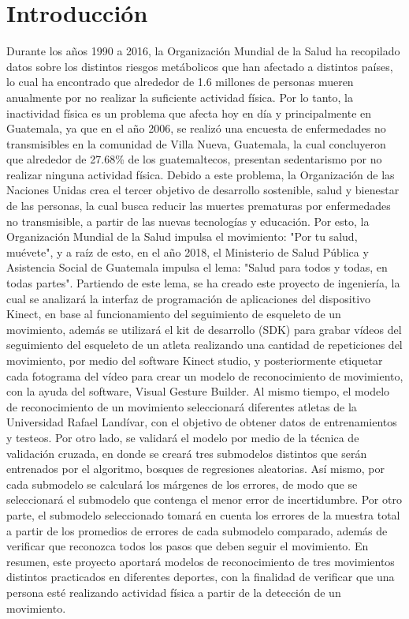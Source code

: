 \afterpage{\blankpage}
\newpage
\chapter{Introducci\'on}
Durante los a\~nos 1990 a 2016, la Organizaci\'on Mundial de la Salud ha recopilado datos sobre los distintos riesgos met\'abolicos que han afectado a distintos pa\'ises, lo cual ha encontrado que alrededor de 1.6 millones de personas mueren anualmente por no realizar la suficiente actividad f\'isica. Por lo tanto, la inactividad f\'isica es un problema que afecta hoy en d\'ia y principalmente en Guatemala, ya que en el a\~no 2006, se realiz\'o una encuesta de enfermedades no transmisibles en la comunidad de Villa Nueva, Guatemala, la cual concluyeron que alrededor de 27.68\% de los guatemaltecos, presentan sedentarismo por no realizar ninguna actividad f\'isica.
\medbreak
Debido a este problema, la Organizaci\'on de las Naciones Unidas crea el tercer objetivo de desarrollo sostenible, salud y bienestar de las personas, la cual busca reducir las muertes prematuras por enfermedades no transmisible, a partir de las nuevas tecnolog\'ias y educaci\'on. Por esto, la Organizaci\'on Mundial de la Salud impulsa el movimiento: "Por tu salud, mu\'evete", y a ra\'iz de esto, en el a\~no 2018, el Ministerio de Salud P\'ublica y Asistencia Social de Guatemala impulsa el lema: "Salud para todos y todas, en todas partes".
\medbreak
Partiendo de este lema, se ha creado este proyecto de ingenier\'ia, la cual se analizar\'a la interfaz de programaci\'on de aplicaciones del dispositivo Kinect, en base al funcionamiento del seguimiento de esqueleto de un movimiento, adem\'as se utilizar\'a el kit de desarrollo (SDK) para grabar v\'ideos del seguimiento del esqueleto de un atleta realizando una cantidad de repeticiones del movimiento, por medio del software Kinect studio, y posteriormente etiquetar cada fotograma del v\'ideo para crear un modelo de reconocimiento de movimiento, con la ayuda del software, Visual Gesture Builder.
\medbreak
Al mismo tiempo, el modelo de reconocimiento de un movimiento seleccionar\'a diferentes atletas de la Universidad Rafael Land\'ivar, con el objetivo de obtener datos de entrenamientos y testeos. Por otro lado, se validar\'a el modelo por medio de la t\'ecnica de validaci\'on cruzada, en donde se crear\'a tres submodelos distintos que ser\'an entrenados por el algoritmo, bosques de regresiones aleatorias. As\'i mismo, por cada submodelo se calcular\'a los m\'argenes de los errores, de modo que se seleccionar\'a el submodelo que contenga el menor error de incertidumbre.
\medbreak
Por otro parte, el submodelo seleccionado tomar\'a en cuenta los errores de la muestra total a partir de los promedios de errores de cada submodelo comparado, adem\'as de verificar que reconozca todos los pasos que deben seguir el movimiento.
\medbreak
En resumen, este proyecto aportar\'a modelos de reconocimiento de tres movimientos distintos practicados en diferentes deportes, con la finalidad de verificar que una persona est\'e realizando actividad f\'isica a partir de la detecci\'on de un movimiento.

